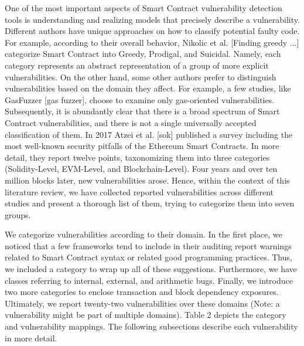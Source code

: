 \documentclass[a4paper,11pt]{article}
\begin{document}
One of the most important aspects of Smart Contract vulnerability detection
tools is understanding and realizing models that precisely describe a
vulnerability. Different authors have unique approaches on how to classify
potential faulty code. For example, according to their overall behavior,
Nikolic et al. [Finding greedy ...] categorize Smart Contract into Greedy,
Prodigal, and Suicidal. Namely, each category represents an abstract
representation of a group of more explicit vulnerabilities. On the other hand,
some other authors prefer to distinguish vulnerabilities based on the domain
they affect. For example, a few studies, like GasFuzzer [gas fuzzer], choose to
examine only gas-oriented vulnerabilities. Subsequently, it is abundantly clear
that there is a broad spectrum of Smart Contract vulnerabilities, and there is
not a single universally accepted classification of them. In 2017 Atzei et al.
[sok] published a survey including the most well-known security pitfalls of the
Ethereum Smart Contracts. In more detail, they report twelve points,
taxonomizing them into three categories (Solidity-Level, EVM-Level, and
Blockchain-Level). Four years and over ten million blocks later, new
vulnerabilities arose. Hence, within the context of this literature review, we
have collected reported vulnerabilities across different studies and present a
thorough list of them, trying to categorize them into seven groups.

We categorize vulnerabilities according to their domain. In the first place, we
noticed that a few frameworks tend to include in their auditing report warnings
related to Smart Contract syntax or related good programming practices. Thus, we
included a category to wrap up all of these suggestions. Furthermore, we have
classes referring to internal, external, and arithmetic bugs. Finally, we
introduce two more categories to enclose transaction and block dependency
exposures. Ultimately, we report twenty-two vulnerabilities over these domains
(Note: a vulnerability might be part of multiple domains). Table 2 depicts the
category and vulnerability mappings. The following subsections describe each
vulnerability in more detail.
\end{document}
